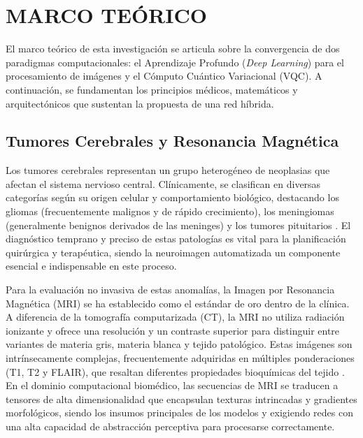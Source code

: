 \documentclass[12pt,letterpaper]{article}
\begin{document}
    \newpage
    \section{MARCO TEÓRICO}
    \vspace{-0.5cm}

    El marco teórico de esta investigación se articula sobre la convergencia de dos paradigmas computacionales: el Aprendizaje Profundo (\textit{Deep Learning}) para el procesamiento de imágenes y el Cómputo Cuántico Variacional (VQC). A continuación, se fundamentan los principios médicos, matemáticos y arquitectónicos que sustentan la propuesta de una red híbrida.

    \subsection{Tumores Cerebrales y Resonancia Magnética}
    \vspace{-0.5cm}
    Los tumores cerebrales representan un grupo heterogéneo de neoplasias que afectan el sistema nervioso central. Clínicamente, se clasifican en diversas categorías según su origen celular y comportamiento biológico, destacando los gliomas (frecuentemente malignos y de rápido crecimiento), los meningiomas (generalmente benignos derivados de las meninges) y los tumores pituitarios \citep{louis20212021}. El diagnóstico temprano y preciso de estas patologías es vital para la planificación quirúrgica y terapéutica, siendo la neuroimagen automatizada un componente esencial e indispensable en este proceso.
    
    Para la evaluación no invasiva de estas anomalías, la Imagen por Resonancia Magnética (MRI) se ha establecido como el estándar de oro dentro de la clínica. A diferencia de la tomografía computarizada (CT), la MRI no utiliza radiación ionizante y ofrece una resolución y un contraste superior para distinguir entre variantes de materia gris, materia blanca y tejido patológico. Estas imágenes son intrínsecamente complejas, frecuentemente adquiridas en múltiples ponderaciones (T1, T2 y FLAIR), que resaltan diferentes propiedades bioquímicas del tejido \citep{willemink2020preparing}. En el dominio computacional biomédico, las secuencias de MRI se traducen a tensores de alta dimensionalidad que encapsulan texturas intrincadas y gradientes morfológicos, siendo los insumos principales de los modelos y exigiendo redes con una alta capacidad de abstracción perceptiva para procesarse correctamente.
\end{document}

